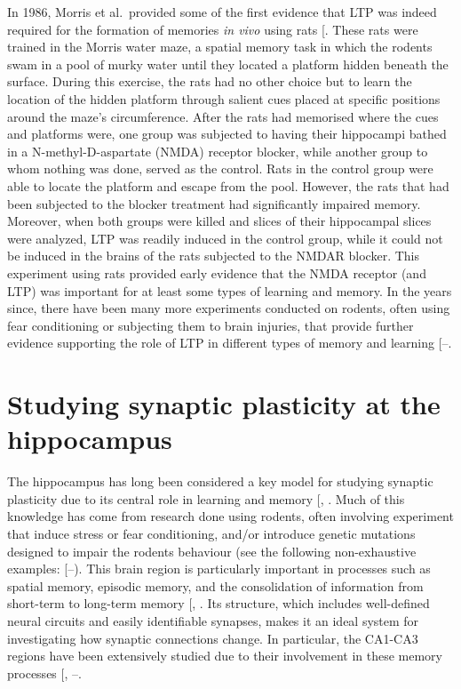 \documentclass[
  11pt,
  letterpaper,
]{scrreprt}
\begin{document}
In 1986, Morris et al.~provided some of the first evidence that LTP was
indeed required for the formation of memories \emph{in vivo} using rats
{[}\citeproc{ref-morris1986Selective}{26}{]}. These rats were trained in
the Morris water maze, a spatial memory task in which the rodents swam
in a pool of murky water until they located a platform hidden beneath
the surface. During this exercise, the rats had no other choice but to
learn the location of the hidden platform through salient cues placed at
specific positions around the maze's circumference. After the rats had
memorised where the cues and platforms were, one group was subjected to
having their hippocampi bathed in a N-methyl-D-aspartate (NMDA) receptor
blocker, while another group to whom nothing was done, served as the
control. Rats in the control group were able to locate the platform and
escape from the pool. However, the rats that had been subjected to the
blocker treatment had significantly impaired memory. Moreover, when both
groups were killed and slices of their hippocampal slices were analyzed,
LTP was readily induced in the control group, while it could not be
induced in the brains of the rats subjected to the NMDAR blocker. This
experiment using rats provided early evidence that the NMDA receptor
(and LTP) was important for at least some types of learning and memory.
In the years since, there have been many more experiments conducted on
rodents, often using fear conditioning or subjecting them to brain
injuries, that provide further evidence supporting the role of LTP in
different types of memory and learning
{[}--\citeproc{ref-park2024Fear}{4}{]}.

\section{Studying synaptic plasticity at the
hippocampus}\label{studying-synaptic-plasticity-at-the-hippocampus}

The hippocampus has long been considered a key model for studying
synaptic plasticity due to its central role in learning and memory
{[},
\citeproc{ref-morris2006Elements}{28}{]}. Much of this knowledge has
come from research done using rodents, often involving experiment that
induce stress or fear conditioning, and/or introduce genetic mutations
designed to impair the rodents behaviour (see the following
non-exhaustive examples:
{[}--\citeproc{ref-park2018Role}{33}{]}).
This brain region is particularly important in processes such as spatial
memory, episodic memory, and the consolidation of information from
short-term to long-term memory
{[},
\citeproc{ref-postle2016Chapter}{35}{]}. Its structure, which includes
well-defined neural circuits and easily identifiable synapses, makes it
an ideal system for investigating how synaptic connections change. In
particular, the CA1-CA3 regions have been extensively studied due to
their involvement in these memory processes
{[},
--\citeproc{ref-rebola2017Operation}{39}{]}.
\end{document}
